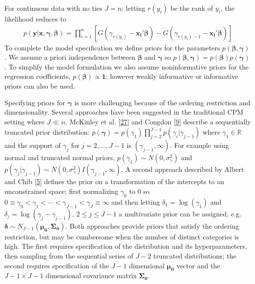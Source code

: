 \documentclass[
]{article}
\begin{document}
For continuous data with no ties \(J=n\); letting \(r(y_i)\) be the rank of \(y_i\), the likelihood reduces to
\begin{gather}
p(\boldsymbol{y}|\boldsymbol{x},\boldsymbol{\gamma},\boldsymbol{\beta})=
\prod_{i=1}^{n}[G(\gamma_{r(y_i)}-\boldsymbol{x_i'\beta})-G(\gamma_{r(y_i)-1}-\boldsymbol{x_i'\beta})]
\end{gather}
To complete the model specification we define priors for the parameters \(p(\boldsymbol{\beta},\boldsymbol{\gamma})\). We assume a priori independence between \(\boldsymbol{\beta}\) and \(\boldsymbol{\gamma}\) so \(p(\boldsymbol{\beta},\boldsymbol{\gamma})=p(\boldsymbol{\beta})p(\boldsymbol{\gamma})\). To simplify the model formulation we also assume noninformative priors for the regression coefficients, \(p(\boldsymbol{\beta}) \propto \boldsymbol{1}\); however weakly informative or informative priors can also be used.

Specifying priors for \(\boldsymbol{\gamma}\) is more challenging because of the ordering restriction and dimensionality. Several approaches have been suggested in the traditional CPM setting where \(J \ll n\). McKinley et al. {[}\protect\hyperlink{ref-mckinley_bayesian_2015}{27}{]} and Congdon {[}\protect\hyperlink{ref-congdon_bayesian_2005}{9}{]} describe a sequentially truncated prior distribution: \(p(\boldsymbol{\gamma})=p(\gamma_1)\prod_{j=2}^{J-1}p(\gamma_i|\gamma_{j-1})\) where \(\gamma_1 \in \mathbb{R}\) and the support of \(\gamma_j\) for \(j=2,\ldots, J-1\) is \((\gamma_{j-1},\infty)\). For example using normal and truncated normal priors, \(p(\gamma_1)\sim N(0, \sigma_\gamma^2)\) and \(p(\gamma_j|\gamma_{j-1}) \sim N(0, \sigma_\gamma^2)I(\gamma_{j-1},\infty)\). A second approach described by Albert and Chib {[}\protect\hyperlink{ref-albert_bayesian_1997}{5}{]} defines the prior on a transformation of the intercepts to an unconstrained space; first normalizing \(\gamma_0\) to 0 so \(0 \equiv \gamma_0 < \gamma_1 < \cdots < \gamma_{J-1} <\gamma_J \equiv \infty\) and then letting \(\delta_1=\log(\gamma_1)\) and \(\delta_j=\log(\gamma_j - \gamma_{j-1}),\, 2 \le j \le J-1\) a multivariate prior can be assigned, e.g.~\(\boldsymbol{\delta} \sim N_{J-1}(\boldsymbol{\mu_0},\boldsymbol{\Sigma_0})\).
Both approaches provide priors that satisfy the ordering restriction, but may be cumbersome when the number of distinct categories is high. The first requires specification of the distribution and its hyperparameters, then sampling from the sequential series of \(J-2\) truncated distributions; the second requires specification of the \(J-1\) dimensional \(\boldsymbol{\mu_0}\) vector and the \(J-1 \times J-1\) dimensional covariance matrix \(\boldsymbol{\Sigma_0}\).
\end{document}
